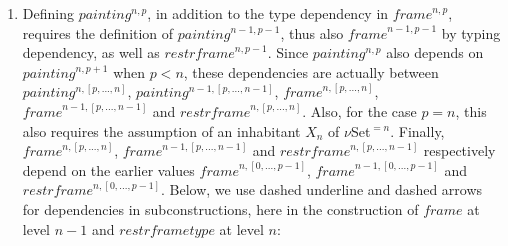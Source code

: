 \documentclass{article}
\newcommand{\myframe}{\mathit{frame}}
\newcommand{\painting}{\mathit{painting}}
\newcommand{\restrframe}{\mathit{restrframe}}
\newcommand{\restrframetype}{\mathit{restrframetype}}
\newcommand{\udensdash}[1]{%
    \tikz[baseline=(todotted.base)]{
        \node[inner sep=1pt,outer sep=0pt] (todotted) {$#1$};
        \draw[densely dashed] (todotted.south west) -- (todotted.south east);
    }%
}%
\begin{document}
\begin{enumerate}
  \item Defining $\painting^{n,p}$, in addition to the type dependency
        in $\myframe^{n,p}$, requires the definition of
        $\painting^{n-1,p-1}$, thus also $\myframe^{n-1,p-1}$ by typing
        dependency, as well as $\restrframe^{n,p-1}$. Since
        $\painting^{n,p}$ also depends on $\painting^{n,p+1}$ when $p<n$,
        these dependencies are actually between $\painting^{n,[p,...,n]}$,
        $\painting^{n-1,[p,...,n-1]}$, $\myframe^{n,[p,...,n]}$,
        $\myframe^{n-1,[p,...,n-1]}$ and $\restrframe^{n,[p,...,n]}$. Also,
        for the case $p=n$, this also requires the assumption of an
        inhabitant $X_{n}$ of $\nu$Set$^{=n}$. Finally,
        $\myframe^{n,[p,...,n]}$, $\myframe^{n-1,[p,...,n-1]}$ and
        $\restrframe^{n,[p,...,n-1]}$ respectively depend on the earlier
        values $\myframe^{n,[0,...,p-1]}$, $\myframe^{n-1,[0,...,p-1]}$ and
        $\restrframe^{n,[0,...,p-1]}$.  Below, we use dashed underline and
        dashed arrows for dependencies in subconstructions, here in the
        construction of $\myframe$ at level $n-1$ and $\restrframetype$ at
        level $n$:
        \begin{center}
        \end{center}


\end{enumerate}
\end{document}
